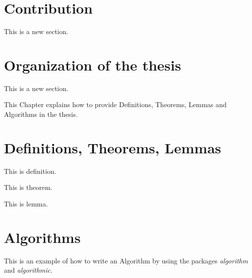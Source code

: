 \section{Contribution}

This is a new section.


\section{Organization of the thesis}

This is a new section.



This Chapter explains how to provide Definitions, Theorems, Lemmas and Algorithms in the thesis.

\section{Definitions, Theorems, Lemmas}

\begin{definition}
		This is definition.
\end{definition}

\begin{theorem}
		This is theorem. 
\end{theorem}

\begin{lemma}
		This is lemma. 
\end{lemma}

\section{Algorithms}

This is an example of how to write an Algorithm by using the packages \textit{algorithm} and \textit{algorithmic}.


